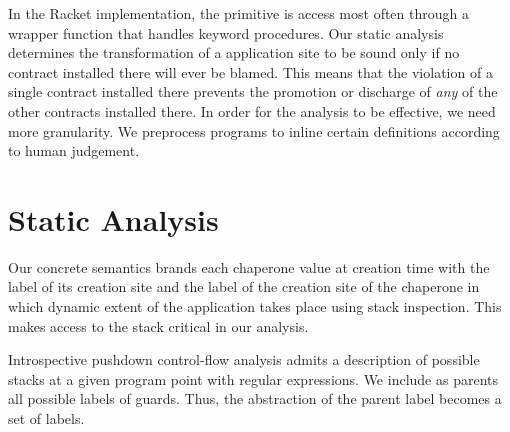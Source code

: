 \documentclass{sigplanconf}
\begin{document}

In the Racket implementation, the  primitive is access most often through a wrapper function that handles keyword procedures.
Our static analysis determines the transformation of a  application site to be sound only if no contract installed there will ever be blamed.
This means that the violation of a single contract installed there prevents the promotion or discharge of \emph{any} of the other contracts installed there.
In order for the analysis to be effective, we need more granularity.
We preprocess programs to inline certain definitions according to human judgement.

\section{Static Analysis}

Our concrete semantics brands each chaperone value at creation time with the label of its creation site and the label of the creation site of the chaperone in which dynamic extent of the application takes place using stack inspection. This makes access to the stack critical in our analysis.

Introspective pushdown control-flow analysis admits a description of possible stacks at a given program point with regular expressions. We include as parents all possible labels of guards. Thus, the abstraction of the parent label becomes a set of labels.


\end{document}
